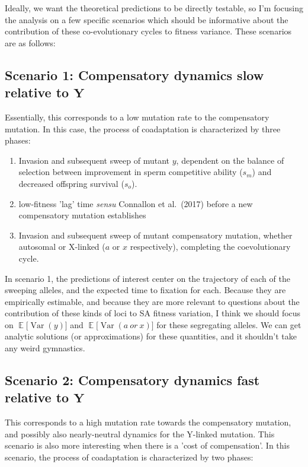 \documentclass{article}
\DeclareMathOperator{\Var}{Var}
\begin{document}
\noindent{} Ideally, we want the theoretical predictions to be directly testable, so I'm focusing the analysis on a few specific scenarios which should be informative about the contribution of these co-evolutionary cycles to fitness variance. These scenarios are as follows:

\subsection*{Scenario 1: Compensatory dynamics slow relative to $\mathbf{Y}$}

Essentially, this corresponds to a low mutation rate to the compensatory mutation. In this case, the process of coadaptation is characterized by three phases:

\begin{enumerate}
	\item Invasion and subsequent sweep of mutant $y$, dependent on the balance of selection between improvement in sperm competitive ability ($s_m$) and decreased offspring survival ($s_o$).
	\item low-fitness 'lag' time \textit{sensu} Connallon et al.~(2017) before a new compensatory mutation establishes
	\item Invasion and subsequent sweep of mutant compensatory mutation, whether autosomal or X-linked ($a$ or $x$ respectively), completing the coevolutionary cycle.
\end{enumerate}

\noindent{} In scenario 1, the predictions of interest center on the trajectory of each of the sweeping alleles, and the expected time to fixation for each. Because they are empirically estimable, and because they are more relevant to questions about the contribution of these kinds of loci to SA fitness variation, I think we should focus on $\mathop{{}\mathbb{E}}\Big[\Var(y)\Big]$ and $\mathop{{}\mathbb{E}}\Big[\Var(a~or~x)\Big]$ for these segregating alleles. We can get analytic solutions (or approximations) for these quantities, and it shouldn't take any weird gymnastics.

\subsection*{Scenario 2: Compensatory dynamics fast relative to $\mathbf{Y}$}

This corresponds to a high mutation rate towards the compensatory mutation, and possibly also nearly-neutral dynamics for the Y-linked mutation. This scenario is also more interesting when there is a 'cost of compensation'. In this scenario, the process of coadaptation is characterized by two phases:
\end{document}
